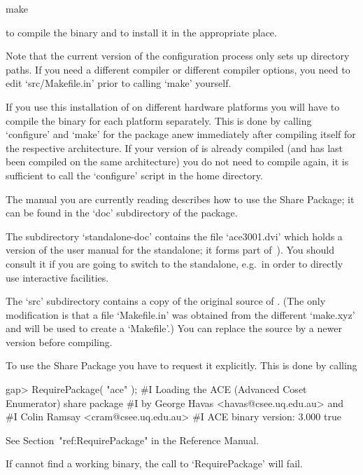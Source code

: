 \begintt
make
\endtt

to compile the binary and to install it in the appropriate place.

Note that the  current version of the configuration  process only sets
up  directory paths.  If you  need a  different compiler  or different
compiler options, you need  to edit `src/Makefile.in' prior to calling
`make' yourself.

If you use this installation of {\GAP} on different hardware platforms
you will have to compile the binary for each platform separately. This
is  done  by calling  `configure'  and  `make'  for the  package  anew
immediately   after  compiling  {\GAP}   itself  for   the  respective
architecture.  If your version of  {\GAP} is already compiled (and has
last  been compiled  on  the same  architecture)  you do  not need  to
compile {\GAP} again, it is  sufficient to call the `configure' script
in the {\GAP} home directory.

The manual you are currently reading describes how to use  the  {\ACE}
Share Package; it can be  found  in  the  `doc'  subdirectory  of  the
package.

The  subdirectory  `standalone-doc'  contains the  file  `ace3001.dvi'
which holds a version of the user manual for the {\ACE} standalone; it
forms part of~\cite{Ram99}).  You  should consult it if  you are going
to  switch to  the {\ACE}  standalone, e.g.~in  order to  directly use
interactive facilities.

The  `src' subdirectory  contains a  copy  of the  original source  of
{\ACE}.  (The  only modification  is  that  a  file `Makefile.in'  was
obtained from  the different `make.xyz' and  will be used  to create a
`Makefile'.)  You  can replace  the source by  a newer  version before
compiling.


To use the {\ACE} Share Package you have  to  request  it  explicitly.
This is done by calling

\begintt
gap> RequirePackage( "ace" );
#I  Loading the ACE (Advanced Coset Enumerator) share package
#I           by George Havas <havas@csee.uq.edu.au> and
#I              Colin Ramsay <cram@csee.uq.edu.au>
#I                   ACE binary version: 3.000
true
\endtt

See Section~"ref:RequirePackage" in the {\GAP} Reference Manual.

If {\GAP} cannot find a working binary, the call  to  `RequirePackage'
will fail.

